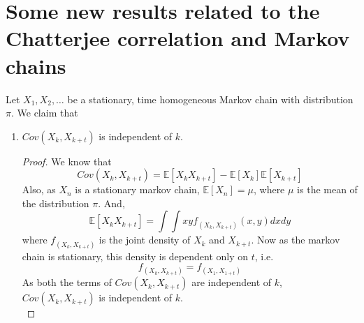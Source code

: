 \chapter{Some new results related to the Chatterjee correlation and Markov chains}

\begin{theorem}
    Let $X_1, X_2, \dots$ be a stationary, time homogeneous Markov chain with distribution $\pi$. We claim that 
    \begin{enumerate}
        \item $Cov(X_k, X_{k+t})$ is independent of $k$.
            \begin{proof}
                We know that
                $$Cov(X_k, X_{k+t}) = \mathbb{E}[X_k X_{k+t}] - \mathbb{E}[X_k]\mathbb{E}[X_{k+t}]$$
                Also, as $X_n$ is a stationary markov chain, $\mathbb{E}[X_n] = \mu$, where $\mu$ is the mean of the distribution $\pi$. 
                And, 
                $$\mathbb{E}[X_k X_{k+t}] = \int\int xyf_{(X_k, X_{k+t})}(x, y)dxdy$$
                where $f_{(X_k, X_{k+t})}$ is the joint density of $X_k$ and $X_{k+t}$. Now as the markov chain is stationary, this density is dependent only on $t$, i.e. $$f_{(X_k, X_{k+t})} = f_{(X_1, X_{1+t})}$$
                As both the terms of $Cov(X_k, X_{k+t})$ are independent of $k$, $Cov(X_k, X_{k+t})$ is independent of $k$.\\
            \end{proof}
            

\end{enumerate}
\end{theorem}
